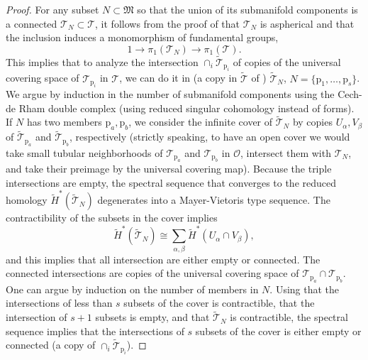 \documentclass[reqno]{amsart}
\newcommand{\p}{\mathrm{p}}
\newcommand{\cO}{\mathcal{O}}
\newcommand{\cT}{\mathcal{T}}
\begin{document}
\begin{proof}
For any subset  $N\subset \mathfrak{M}$ so that the union of its submanifold components is a connected $\cT_N\subset \cT$, it follows from the proof of \cite[Theorem 1B.11]{Ha} that $\cT_N$ is aspherical and that the inclusion induces a monomorphism of fundamental groups,
\[1\to \pi_1(\cT_N)\to \pi_{1}(\cT).\]
This implies that to analyze the intersection $\cap_i\widetilde{\cT}_{\p_i}$ of copies of the universal covering space of $\cT_{\p_i}$ in $\cT$, we can do it in (a copy in $\widetilde{\cT}$ of ) $\widetilde{\cT}_N$, $N=\{\p_1,\dots,\p_s\}$. We argue by induction in the number of submanifold components using the Cech-de Rham double complex (using reduced singular cohomology instead of forms). If $N$ has two members $\p_a,\p_b$, we consider the infinite cover of $\widetilde{\cT}_N$ by copies $U_\alpha,V_\beta$ of $\widetilde{\cT}_{\p_a}$ and  $\widetilde{\cT}_{\p_b}$, respectively  (strictly speaking, to have an open cover we would take small tubular neighborhoods of $\cT_{\p_a}$ and $\cT_{\p_b}$ in $\cO$, intersect them with $\cT_N$, and take their preimage by the universal covering map). Because the triple intersections are empty, the spectral sequence that converges to the reduced homology
$\widetilde{H}^*(\widetilde{\cT}_N)$ degenerates into a Mayer-Vietoris type sequence. The contractibility of the subsets in the cover implies
\[\widetilde{H}^*(\widetilde{\cT}_N)\cong \sum_{\alpha,\beta}\widetilde{H}^*(U_\alpha\cap V_\beta),\]
and this implies that all intersection are either empty or connected. The connected intersections are copies of the universal covering space of $\cT_{\p_a}\cap \cT_{\p_b}$. One can argue  by induction on the number of members in $N$.  Using that the intersections of less than $s$ subsets of the cover is contractible, that  the intersection of $s+1$ subsets is empty, and that $\widetilde{\cT}_N$ is contractible, the spectral sequence
implies that the intersections of $s$ subsets of the cover is either empty or connected (a copy of $\cap_i\widetilde{\cT}_{\p_i}$).
\end{proof}
\end{document}
